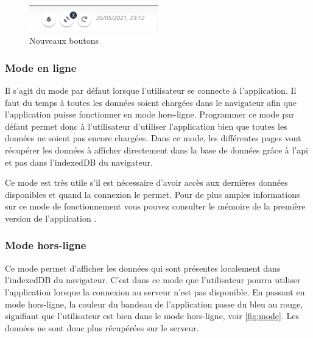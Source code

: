 \documentclass{EPL-master-thesis-covers-FR}
\begin{document}
				\begin{figure}[H]
					\centering
					\includegraphics[width=0.5\textwidth]{images/buttons}
					\caption{Nouveaux boutons}
					\label{fig:buttons}
				\end{figure}
			
			\subsubsection*{Mode en ligne}
				Il s'agit du mode par défaut lorsque l'utilisateur se connecte à l'application. Il faut du temps à toutes les données soient chargées dans le navigateur afin que l'application puisse fonctionner en mode hors-ligne. Programmer ce mode par défaut permet donc à l'utilisateur d'utiliser l'application bien que toutes les données ne soient pas encore chargées. Dans ce mode, les différentes pages vont récupérer les données à afficher directement dans la base de données grâce à l'\gls{api} et pas dans l'indexedDB du navigateur. 
				
				Ce mode est très utile s'il est nécessaire d'avoir accès aux dernières données disponibles et quand la connexion le permet. Pour de plus amples informations sur ce mode de fonctionnement vous pouvez consulter le mémoire de la première version de l'application \cite{ref:haitiwater}.
			
			
			\subsubsection*{Mode hors-ligne}
				Ce mode permet d'afficher les données qui sont présentes localement dans l'indexedDB du navigateur. C'est dans ce mode que l'utilisateur pourra utiliser l'application lorsque la connexion au serveur n'est pas disponible. En passant en mode hors-ligne, la couleur du bandeau de l'application passe du bleu au rouge, signifiant que l'utilisateur est bien dans le mode hors-ligne, voir \ref{fig:mode}. Les données ne sont donc plus récupérées sur le serveur.
								
\end{document}
